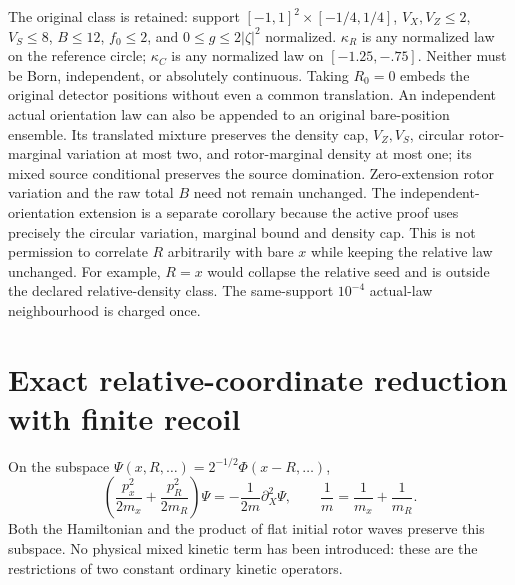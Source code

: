 \documentclass[11pt]{article}
\theoremstyle{definition}\newtheorem{definition}[theorem]{Definition}
\theoremstyle{remark}\newtheorem{remark}[theorem]{Remark}
\begin{document}
The original class is retained: support $[-1,1]^2\times[-1/4,1/4]$, $V_X,V_Z\le2$, $V_S\le8$, $B\le12$, $f_0\le2$, and $0\le g\le2|\zeta|^2$ normalized. $\kappa_R$ is any normalized law on the reference circle; $\kappa_C$ is any normalized law on $[-1.25,-.75]$. Neither must be Born, independent, or absolutely continuous. Taking $R_0=0$ embeds the original detector positions without even a common translation. An independent actual orientation law can also be appended to an original bare-position ensemble. Its translated mixture preserves the density cap, $V_Z,V_S$, circular rotor-marginal variation at most two, and rotor-marginal density at most one; its mixed source conditional preserves the source domination. Zero-extension rotor variation and the raw total $B$ need not remain unchanged. The independent-orientation extension is a separate corollary because the active proof uses precisely the circular variation, marginal bound and density cap. This is not permission to correlate $R$ arbitrarily with bare $x$ while keeping the relative law unchanged. For example, $R=x$ would collapse the relative seed and is outside the declared relative-density class. The same-support $10^{-4}$ actual-law neighbourhood is charged once.

\section{Exact relative-coordinate reduction with finite recoil}
On the subspace $\Psi(x,R,\ldots)=2^{-1/2}\Phi(x-R,\ldots)$,
\[
 \left(\frac{p_x^2}{2m_x}+\frac{p_R^2}{2m_R}\right)\Psi
 =-\frac1{2m}\partial_X^2\Psi,
 \qquad\frac1m=\frac1{m_x}+\frac1{m_R}.
\]
Both the Hamiltonian and the product of flat initial rotor waves preserve this subspace. No physical mixed kinetic term has been introduced: these are the restrictions of two constant ordinary kinetic operators.
\end{document}

